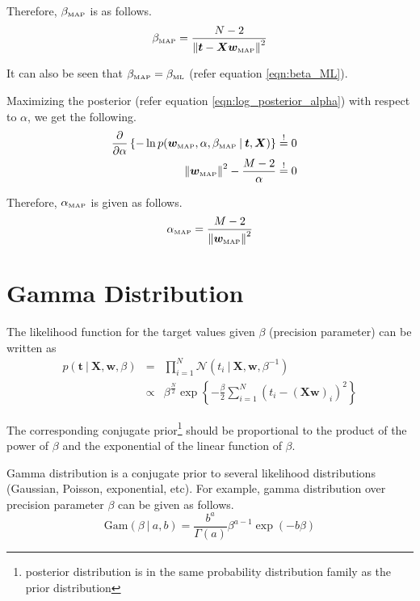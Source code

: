 \documentclass[11pt]{article}
\newcommand{\mle}[1]{{#1}_{\text{\tiny ML}}}
\newcommand{\map}[1]{{#1}_{\text{\tiny MAP}}}
\newcommand\given[1][]{\:#1\vert\:}
\newcommand{\norm}[1]{\left\lVert#1\right\rVert}
\begin{document}
Therefore, $\map{\beta}$ is as follows.
\begin{equation}
    \map{\beta} = \frac{N-2}{\norm{\bm{t} - \bm{X}\map{\bm{w}}}^2}
\end{equation}

It can also be seen that $\map{\beta} = \mle{\beta}$ (refer equation \ref{eqn:beta_ML}).

Maximizing the posterior (refer equation \ref{eqn:log_posterior_alpha}) with respect to $\alpha$, we get the following.
\begin{eqnarray}
    \frac{\partial }{\partial  \alpha} \left\{ -\ln{p(\map{\bm{w}}, \alpha, \map{\beta} \given \bm{t}, \bm{X})} \right\}
    &\overset{!}{=} 0&  \\
    \norm{\map{\bm{w}}}^2 - \frac{M-2}{\alpha}
    &\overset{!}{=} 0& 
\end{eqnarray}

Therefore, $\map{\alpha}$ is given as follows.
\begin{equation}\label{alpha_map}
    \map{\alpha} = \frac{M-2}{\norm{\map{\bm{w}}}^2}
\end{equation}

\section{Gamma Distribution}

The likelihood function for the target values given $\beta$ (precision parameter) can be written as 
\begin{eqnarray}
    p(\bm{t} \given \bm{X}, \bm{w}, \beta) &=& \prod_{i=1}^N \mathcal{N}(t_i \given \bm{X}, \bm{w}, \beta^{-1}) \\
    &\propto& \beta^{\frac{N}{2}}\exp\left\{-\frac{\beta}{2} \sum_{i=1}^N(t_i - (\bm{X}\bm{w})_i)^2 \right\}
\end{eqnarray}

The corresponding conjugate prior\footnote{posterior distribution is in the same probability distribution family as the prior distribution} should be proportional to the product of the power of $\beta$ and the exponential of the linear function of $\beta$. 

Gamma distribution is a conjugate prior to several likelihood distributions (Gaussian, Poisson, exponential, etc). For example, gamma distribution over precision parameter $\beta$ can be given as follows.
\begin{equation} \label{gamma_dist}
    \text{Gam}\left(\beta \given a, b\right) = \frac{b^a}{\Gamma(a)}\beta^{a-1}\exp{(-b\beta)}
\end{equation}
\end{document}
